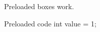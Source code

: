 \documentclass{article}
\begin{document}
\begin{note}Preloaded boxes work.\end{note}
\begin{cpp}{Preloaded code}
int value = 1;
\end{cpp}
\end{document}
